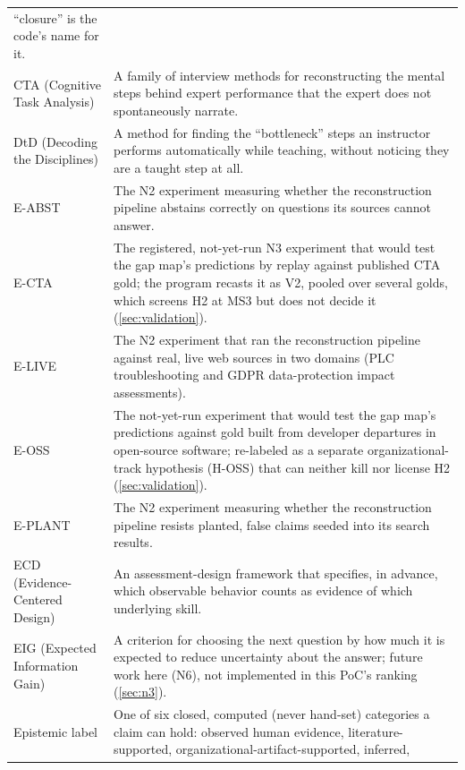 \begin{longtable}{
    >{\raggedright\arraybackslash}p{3.2cm}
    >{\raggedright\arraybackslash}p{10.3cm}
  }
    \enquote{closure} is the code's name for it. \\
  \addlinespace[2pt]
  CTA (Cognitive Task Analysis) & A family of interview methods for reconstructing the mental
    steps behind expert performance that the expert does not spontaneously narrate. \\
  \addlinespace[2pt]
  DtD (Decoding the Disciplines) & A method for finding the \enquote{bottleneck} steps an
    instructor performs automatically while teaching, without noticing they are a taught step at
    all. \\
  \addlinespace[2pt]
  E-ABST & The N2 experiment measuring whether the reconstruction pipeline abstains correctly on
    questions its sources cannot answer. \\
  \addlinespace[2pt]
  E-CTA & The registered, not-yet-run N3 experiment that would test the gap map's predictions by
    replay against published CTA gold; the program recasts it as V2, pooled over several golds,
    which screens H2 at MS3 but does not decide it (\cref{sec:validation}). \\
  \addlinespace[2pt]
  E-LIVE & The N2 experiment that ran the reconstruction pipeline against real, live web sources
    in two domains (PLC troubleshooting and GDPR data-protection impact assessments). \\
  \addlinespace[2pt]
  E-OSS & The not-yet-run experiment that would test the gap map's predictions against gold built
    from developer departures in open-source software; re-labeled as a separate organizational-track
    hypothesis (H-OSS) that can neither kill nor license H2 (\cref{sec:validation}). \\
  \addlinespace[2pt]
  E-PLANT & The N2 experiment measuring whether the reconstruction pipeline resists planted, false
    claims seeded into its search results. \\
  \addlinespace[2pt]
  ECD (Evidence-Centered Design) & An assessment-design framework that specifies, in advance,
    which observable behavior counts as evidence of which underlying skill. \\
  \addlinespace[2pt]
  EIG (Expected Information Gain) & A criterion for choosing the next question by how much it is
    expected to reduce uncertainty about the answer; future work here (N6), not implemented in
    this PoC's ranking (\cref{sec:n3}). \\
  \addlinespace[2pt]
  Epistemic label & One of six closed, computed (never hand-set) categories a claim can hold:
    observed human evidence, literature-supported, organizational-artifact-supported, inferred,

\end{longtable}
